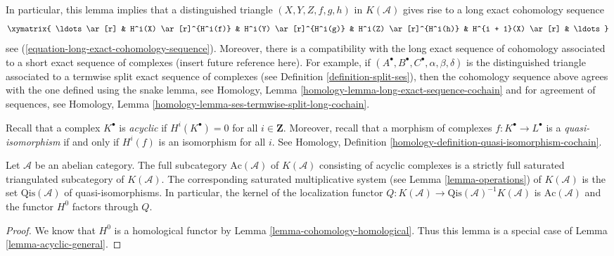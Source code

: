 \noindent
In particular, this lemma implies that a distinguished triangle
$(X, Y, Z, f, g, h)$ in $K(\mathcal{A})$ gives rise to a long exact
cohomology sequence
\begin{equation}
\label{equation-long-exact-cohomology-sequence-D}
\xymatrix{
\ldots \ar[r] &
H^i(X) \ar[r]^{H^i(f)} &
H^i(Y) \ar[r]^{H^i(g)} &
H^i(Z) \ar[r]^{H^i(h)} &
H^{i + 1}(X) \ar[r] & \ldots
}
\end{equation}
see (\ref{equation-long-exact-cohomology-sequence}). Moreover, there is
a compatibility with the long exact sequence of cohomology associated to
a short exact sequence of complexes (insert future reference here). For
example, if $(A^\bullet, B^\bullet, C^\bullet, \alpha, \beta, \delta)$
is the distinguished triangle associated to a termwise split exact
sequence of complexes (see
Definition \ref{definition-split-ses}),
then the cohomology sequence above agrees with the one defined using the
snake lemma, see
Homology, Lemma \ref{homology-lemma-long-exact-sequence-cochain}
and for agreement of sequences, see
Homology, Lemma \ref{homology-lemma-ses-termwise-split-long-cochain}.

\medskip\noindent
Recall that a complex $K^\bullet$ is {\it acyclic} if $H^i(K^\bullet) = 0$
for all $i \in \mathbf{Z}$. Moreover, recall that a morphism of complexes
$f : K^\bullet \to L^\bullet$ is a {\it quasi-isomorphism} if and only if
$H^i(f)$ is an isomorphism for all $i$. See
Homology, Definition \ref{homology-definition-quasi-isomorphism-cochain}.

\begin{lemma}
\label{lemma-acyclic}
Let $\mathcal{A}$ be an abelian category. The full subcategory
$\text{Ac}(\mathcal{A})$ of $K(\mathcal{A})$ consisting of acyclic complexes
is a strictly full saturated triangulated subcategory of $K(\mathcal{A})$.
The corresponding saturated multiplicative system (see
Lemma \ref{lemma-operations})
of $K(\mathcal{A})$ is the set $\text{Qis}(\mathcal{A})$
of quasi-isomorphisms. In particular, the kernel of the localization
functor $Q : K(\mathcal{A}) \to \text{Qis}(\mathcal{A})^{-1}K(\mathcal{A})$
is $\text{Ac}(\mathcal{A})$ and the functor $H^0$ factors through $Q$.
\end{lemma}

\begin{proof}
We know that $H^0$ is a homological functor by
Lemma \ref{lemma-cohomology-homological}.
Thus this lemma is a special case of
Lemma \ref{lemma-acyclic-general}.
\end{proof}

